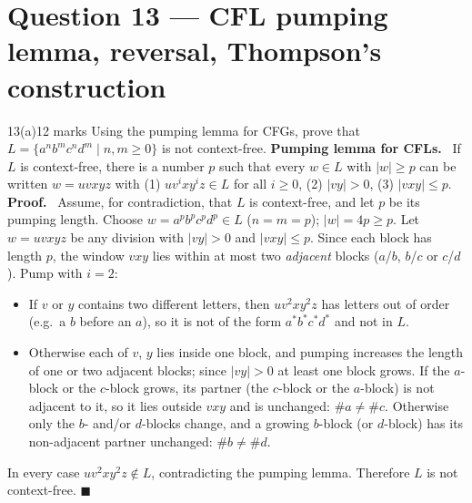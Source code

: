 \documentclass[10.5pt,a4paper]{article}
\newcommand{\ansh}[1]{\textbf{\color{exborder}#1}\ }
\begin{document}
\section{Question 13 --- CFL pumping lemma, reversal, Thompson's construction}
\begin{qa}{13(a)}{12 marks}
Using the pumping lemma for CFGs, prove that $L=\{a^nb^mc^nd^m\mid n,m\ge0\}$ is not context-free.
\tcblower
\ansh{Pumping lemma for CFLs.} If $L$ is context-free, there is a number $p$ such that every $w\in L$ with $|w|\ge p$ can be written $w=uvxyz$ with
(1) $uv^ixy^iz\in L$ for all $i\ge0$, (2) $|vy|>0$, (3) $|vxy|\le p$.\\
\ansh{Proof.} Assume, for contradiction, that $L$ is context-free, and let $p$ be its pumping length. Choose $w=a^pb^pc^pd^p\in L$
($n=m=p$); $|w|=4p\ge p$. Let $w=uvxyz$ be any division with $|vy|>0$ and $|vxy|\le p$. Since each block has length $p$, the window $vxy$ lies within
at most two \emph{adjacent} blocks ($a$/$b$, $b$/$c$ or $c$/$d$). Pump with $i=2$:
\begin{itemize}
\item If $v$ or $y$ contains two different letters, then $uv^2xy^2z$ has letters out of order (e.g.\ a $b$ before an $a$), so it is not of the form
$a^*b^*c^*d^*$ and not in $L$.
\item Otherwise each of $v$, $y$ lies inside one block, and pumping increases the length of one or two adjacent blocks; since $|vy|>0$ at least one
block grows. If the $a$-block or the $c$-block grows, its partner (the $c$-block or the $a$-block) is not adjacent to it, so it lies outside $vxy$
and is unchanged: $\#a\ne\#c$. Otherwise only the $b$- and/or $d$-blocks change, and a growing $b$-block (or $d$-block) has its non-adjacent partner
unchanged: $\#b\ne\#d$.
\end{itemize}
In every case $uv^2xy^2z\notin L$, contradicting the pumping lemma. Therefore $L$ is not context-free. $\blacksquare$
\end{qa}
\end{document}

